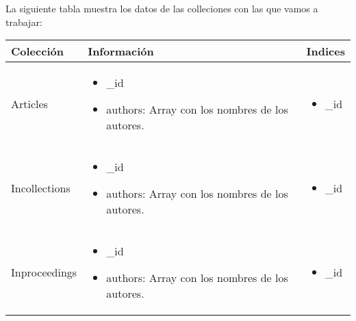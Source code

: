 La siguiente tabla muestra los datos de las colleciones con las que vamos a trabajar:

\begin{center}
  \begin{tabular}{ | l | l | l |}
    \hline
    Colección & Información  &  Indices \\ \hline
    
    Articles &
    \begin{minipage}[t]{0.4\textwidth}
      \begin{itemize}
	\item \_id
	\item authors: Array con los nombres de los autores.
      \end{itemize}
    \end{minipage} & 
    \begin{minipage}[t]{0.3\textwidth}
      \begin{itemize}
	\item \_id
      \end{itemize} 
    \end{minipage}  \\ \hline
    
    Incollections &
    \begin{minipage}[t]{0.4\textwidth}
      \begin{itemize}
	\item \_id
	\item authors: Array con los nombres de los autores.
      \end{itemize}
    \end{minipage} & 
    \begin{minipage}[t]{0.3\textwidth}
      \begin{itemize}
	\item \_id
      \end{itemize}
    \end{minipage}  \\ \hline
    
    Inproceedings &
    \begin{minipage}[t]{0.4\textwidth}
      \begin{itemize}
	\item \_id
	\item authors: Array con los nombres de los autores.
      \end{itemize}
    \end{minipage} & 
    \begin{minipage}[t]{0.3\textwidth}
      \begin{itemize}
	\item \_id
      \end{itemize} 
    \end{minipage}  \\ \hline
    

\end{tabular}
\end{center}
